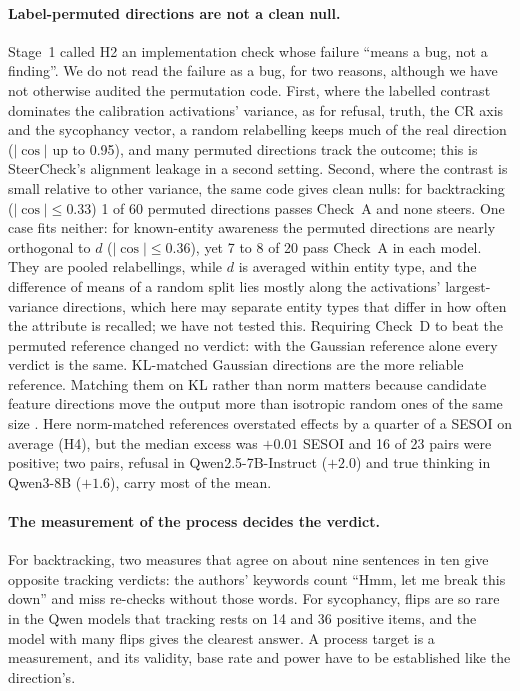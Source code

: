 \documentclass[11pt]{article}
\begin{document}
\paragraph{Label-permuted directions are not a clean null.} Stage~1 called H2 an implementation check whose failure ``means a bug, not a finding''. We do not read the failure as a bug, for two reasons, although we have not otherwise audited the permutation code. First, where the labelled contrast dominates the calibration activations' variance, as for refusal, truth, the CR axis and the sycophancy vector, a random relabelling keeps much of the real direction ($|\cos|$ up to 0.95), and many permuted directions track the outcome; this is SteerCheck's alignment leakage \citep{luo2026steercheck} in a second setting. Second, where the contrast is small relative to other variance, the same code gives clean nulls: for backtracking ($|\cos| \le 0.33$) 1 of 60 permuted directions passes Check~A and none steers. One case fits neither: for known-entity awareness the permuted directions are nearly orthogonal to $d$ ($|\cos| \le 0.36$), yet 7 to 8 of 20 pass Check~A in each model. They are pooled relabellings, while $d$ is averaged within entity type, and the difference of means of a random split lies mostly along the activations' largest-variance directions, which here may separate entity types that differ in how often the attribute is recalled; we have not tested this. Requiring Check~D to beat the permuted reference changed no verdict: with the Gaussian reference alone every verdict is the same. KL-matched Gaussian directions are the more reliable reference. Matching them on KL rather than norm matters because candidate feature directions move the output more than isotropic random ones of the same size \citep{ferreiradasilva2026error}. Here norm-matched references overstated effects by a quarter of a SESOI on average (H4), but the median excess was $+0.01$ SESOI and 16 of 23 pairs were positive; two pairs, refusal in Qwen2.5-7B-Instruct ($+2.0$) and true thinking in Qwen3-8B ($+1.6$), carry most of the mean.

\paragraph{The measurement of the process decides the verdict.} For backtracking, two measures that agree on about nine sentences in ten give opposite tracking verdicts: the authors' keywords count ``Hmm, let me break this down'' and miss re-checks without those words. For sycophancy, flips are so rare in the Qwen models that tracking rests on 14 and 36 positive items, and the model with many flips gives the clearest answer. A process target is a measurement, and its validity, base rate and power have to be established like the direction's.
\end{document}
